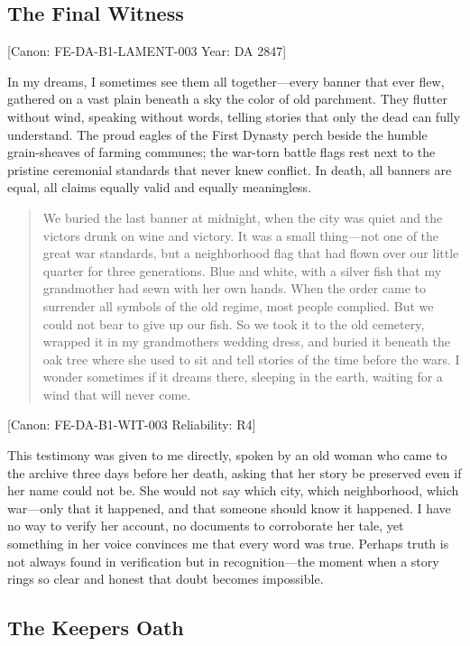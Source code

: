 \subsection{The Final Witness}\label{the-final-witness}

{[}Canon: FE-DA-B1-LAMENT-003 \textbar{} Year: DA 2847{]}

In my dreams, I sometimes see them all together---every banner that ever
flew, gathered on a vast plain beneath a sky the color of old parchment.
They flutter without wind, speaking without words, telling stories that
only the dead can fully understand. The proud eagles of the First
Dynasty perch beside the humble grain-sheaves of farming communes; the
war-torn battle flags rest next to the pristine ceremonial standards
that never knew conflict. In death, all banners are equal, all claims
equally valid and equally meaningless.

\begin{quote}
We buried the last banner at midnight, when the city was quiet and the
victors drunk on wine and victory. It was a small thing---not one of the
great war standards, but a neighborhood flag that had flown over our
little quarter for three generations. Blue and white, with a silver fish
that my grandmother had sewn with her own hands. When the order came to
surrender all symbols of the old regime, most people complied. But we
could not bear to give up our fish. So we took it to the old cemetery,
wrapped it in my grandmother\textquotesingle s wedding dress, and buried
it beneath the oak tree where she used to sit and tell stories of the
time before the wars. I wonder sometimes if it dreams there, sleeping in
the earth, waiting for a wind that will never come.
\end{quote}

{[}Canon: FE-DA-B1-WIT-003 \textbar{} Reliability: R4{]}

This testimony was given to me directly, spoken by an old woman who came
to the archive three days before her death, asking that her story be
preserved even if her name could not be. She would not say which city,
which neighborhood, which war---only that it happened, and that someone
should know it happened. I have no way to verify her account, no
documents to corroborate her tale, yet something in her voice convinces
me that every word was true. Perhaps truth is not always found in
verification but in recognition---the moment when a story rings so clear
and honest that doubt becomes impossible.

\subsection{The Keeper\textquotesingle s Oath}\label{the-keepers-oath}

